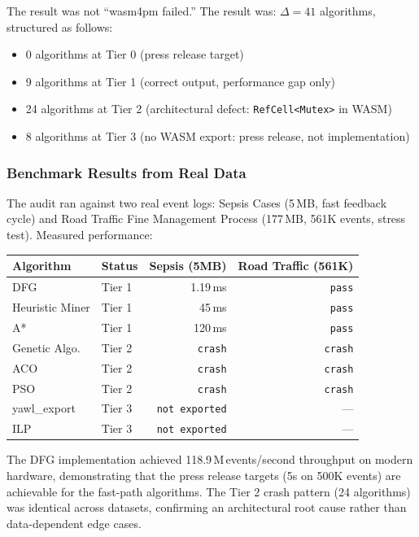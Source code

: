 \documentclass[11pt,a4paper]{article}
\newcommand{\code}[1]{\texttt{#1}}
\newcommand{\gap}{\Delta}
\begin{document}
The result was not ``wasm4pm failed.''  The result was:
$\gap = 41$ algorithms, structured as follows:
\begin{itemize}
  \item 0 algorithms at Tier 0 (press release target)
  \item 9 algorithms at Tier 1 (correct output, performance gap only)
  \item 24 algorithms at Tier 2 (architectural defect: \code{RefCell<Mutex>} in WASM)
  \item 8 algorithms at Tier 3 (no WASM export: press release, not implementation)
\end{itemize}

\subsubsection*{Benchmark Results from Real Data}

The audit ran against two real event logs: Sepsis Cases (5\,MB, fast feedback cycle) and
Road Traffic Fine Management Process (177\,MB, 561K events, stress test).  Measured performance:

\begin{center}
\begin{tabular}{@{}llrr@{}}
  \toprule
  \textbf{Algorithm} & \textbf{Status} & \textbf{Sepsis (5MB)} & \textbf{Road Traffic (561K)}\\
  \midrule
  DFG              & Tier 1 & 1.19\,ms   & \texttt{pass} \\
  Heuristic Miner  & Tier 1 & 45\,ms     & \texttt{pass} \\
  A*               & Tier 1 & 120\,ms    & \texttt{pass} \\
  Genetic Algo.    & Tier 2 & \texttt{crash} & \texttt{crash} \\
  ACO              & Tier 2 & \texttt{crash} & \texttt{crash} \\
  PSO              & Tier 2 & \texttt{crash} & \texttt{crash} \\
  yawl\_export     & Tier 3 & \texttt{not exported} & --- \\
  ILP              & Tier 3 & \texttt{not exported} & --- \\
  \bottomrule
\end{tabular}
\end{center}

The DFG implementation achieved 118.9\,M\,events/second throughput on modern hardware,
demonstrating that the press release targets (5s on 500K events) are achievable for the
fast-path algorithms.  The Tier 2 crash pattern (24 algorithms) was identical across datasets,
confirming an architectural root cause rather than data-dependent edge cases.
\end{document}
